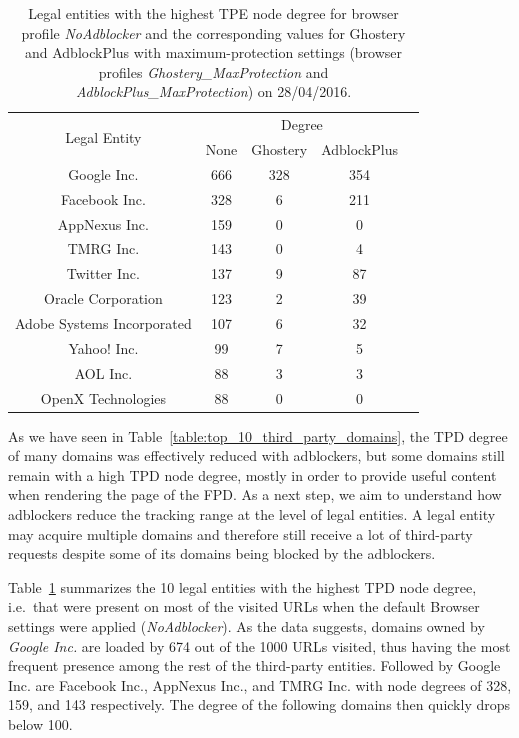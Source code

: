 \documentclass[compsoc, conference, letterpaper, 10pt, times]{IEEEtran}
\begin{document}
\begin{table}
  \centering
  \begin{tabular}{|c|c|c|c|c|}
  \hline
  \multirow{2}{*}{Legal Entity} & \multicolumn{3}{|c|}{Degree} \\
  \cline{2-4}
    & \scriptsize{None} & \scriptsize{Ghostery} & \scriptsize{AdblockPlus} \\
  \hline
  Google Inc. & 666 & 328 & 354 \\
  Facebook Inc. & 328 & 6 & 211 \\
  AppNexus Inc. & 159 & 0 & 0 \\
  TMRG Inc. & 143 & 0 & 4 \\
  Twitter Inc. & 137 & 9 & 87 \\
  Oracle Corporation & 123 & 2 & 39 \\
  Adobe Systems Incorporated & 107 & 6 & 32 \\
  Yahoo! Inc. & 99 & 7 & 5 \\
  AOL Inc. & 88 & 3 & 3 \\
  OpenX Technologies & 88 & 0 & 0 \\
  \hline
  \end{tabular}
  \caption{Legal entities with the highest TPE node degree for browser profile \textit{NoAdblocker} and the corresponding values for Ghostery and AdblockPlus with maximum-protection settings (browser profiles \textit{Ghostery\_MaxProtection} and \textit{AdblockPlus\_MaxProtection}) on 28/04/2016.}
  \label{table:top_10_tpd_entities}
  \end{table}
  
  
As we have seen in Table~\ref{table:top_10_third_party_domains}, the TPD degree of many domains was effectively reduced with adblockers, but some domains still remain with a high TPD node degree, mostly in order to provide useful content when rendering the page of the FPD. As a next step, we aim to understand how adblockers reduce the tracking range at the level of legal entities. A legal entity may acquire multiple domains and therefore still receive a lot of third-party requests despite some of its domains being blocked by the adblockers. 



Table~\ref{table:top_10_tpd_entities} summarizes the 10 legal entities with the highest TPD node degree, i.e.\ that were present on most of the visited URLs when the default Browser settings were applied (\textit{NoAdblocker}). As the data suggests, domains owned by \textit{Google Inc.} are loaded by 674 out of the 1000 URLs visited, thus having the most frequent presence among the rest of the third-party entities. Followed by Google Inc. are Facebook Inc., AppNexus Inc., and TMRG Inc. with node degrees of 328, 159, and 143 respectively. The degree of the following domains then quickly drops below 100. 
\end{document}
